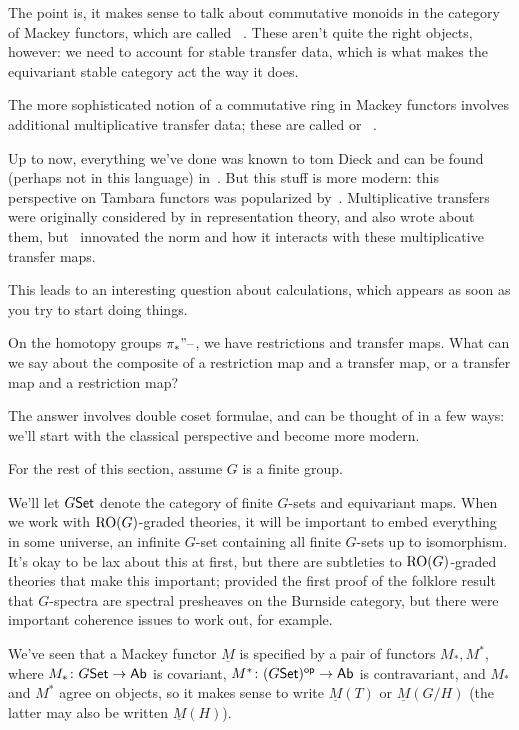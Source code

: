 The point is, it makes sense to talk about commutative monoids in the category of Mackey functors, which are called
~\cite{Green}. These aren't quite the right objects, however: we need to account for stable
transfer data, which is what makes the equivariant stable category act the way it does.

The more sophisticated notion of a commutative ring in Mackey functors involves additional multiplicative transfer
data; these are called  or ~\cite{Tambara}.

Up to now, everything we've done was known to tom Dieck and can be found (perhaps not in this language)
in~\cite{LMS}. But this stuff is more modern: this perspective on Tambara functors was popularized by~\cite{HHR}.
Multiplicative transfers were originally considered by \cite{Evens} in representation theory, and
\cite{GreenleesMay} also wrote about them, but~\cite{HHR} innovated the norm and how it interacts with these
multiplicative transfer maps.

This leads to an interesting question about calculations, which appears as soon as you try to start doing things.
\begin{ques}
On the homotopy groups $\pi_*"\text{--}$, we have restrictions and transfer maps. What can we say about the composite of
a restriction map and a transfer map, or a transfer map and a restriction map?
\end{ques}
The answer involves double coset formulae, and can be thought of in a few ways: we'll start with the classical
perspective and become more modern.

For the rest of this section, assume $G$ is a finite group.

We'll let $G\mathsf{Set}$ denote the category of finite $G$-sets and equivariant maps. When we work with $\mathrm{RO}(G)$-graded
theories, it will be important to embed everything in some universe, an infinite $G$-set containing all finite
$G$-sets up to isomorphism. It's okay to be lax about this at first, but there are subtleties to $\mathrm{RO}(G)$-graded
theories that make this important; \cite{GuillouMay} provided the first proof of the folklore result that
$G$-spectra are spectral presheaves on the Burnside category, but there were important coherence issues to work
out, for example.

We've seen that a Mackey functor $\underline M$ is specified by a pair of functors $M_*,M^*$, where $M_*\colon
G\mathsf{Set}\to\mathsf{Ab}$ is covariant, $M^*\colon (G\mathsf{Set})^{\mathsf{op}}\to\mathsf{Ab}$ is contravariant, and $M_*$ and $M^*$ agree on objects, so
it makes sense to write $\underline M(T)$ or $\underline M(G/H)$ (the latter may also be written $\underline
M(H)$).

